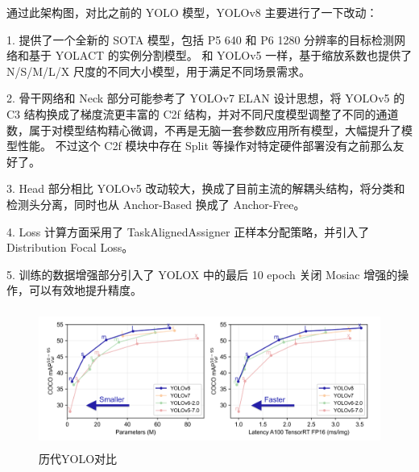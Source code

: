 \documentclass[UTF8]{ctexart}
\begin{document}
通过此架构图，对比之前的 YOLO 模型，YOLOv8 主要进行了一下改动： \par
1. 提供了一个全新的 SOTA 模型，包括 P5 640 和 P6 1280 分辨率的目标检测网络和基于 YOLACT 的实例分割模型。
和 YOLOv5 一样，基于缩放系数也提供了 N/S/M/L/X 尺度的不同大小模型，用于满足不同场景需求。 \par
2. 骨干网络和 Neck 部分可能参考了 YOLOv7 ELAN 设计思想，将 YOLOv5 的 C3 结构换成了梯度流更丰富的 C2f 结构，并对不同尺度模型调整了不同的通道数，属于对模型结构精心微调，不再是无脑一套参数应用所有模型，大幅提升了模型性能。
不过这个 C2f 模块中存在 Split 等操作对特定硬件部署没有之前那么友好了。\par
3. Head 部分相比 YOLOv5 改动较大，换成了目前主流的解耦头结构，将分类和检测头分离，同时也从 Anchor-Based 换成了 Anchor-Free。\par
4. Loss 计算方面采用了 TaskAlignedAssigner 正样本分配策略，并引入了 Distribution Focal Loss。\par
5. 训练的数据增强部分引入了 YOLOX 中的最后 10 epoch 关闭 Mosiac 增强的操作，可以有效地提升精度。\par

\begin{figure}[H]
    \centering %
    \includegraphics[height=4.5cm]{../YOLO/pics/img.png}
    \caption{历代YOLO对比}
\end{figure}

\newpage
\small



\end{document}
